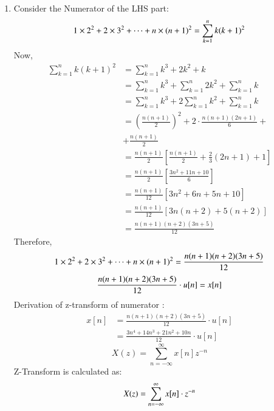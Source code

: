 \documentclass[journal,12pt,twocolumn]{IEEEtran}
\theoremstyle{remark}
\begin{document}
\begin{enumerate}[label=\alph*)]
\item Consider the Numerator of the LHS part:
\begin{equation}
    1\times2^2 + 2\times3^2 + \dots + n\times(n+1)^2 = \sum_{k=1}^n k(k+1)^2 \notag
\end{equation}
Now,
\begin{align*}
    \sum_{k=1}^n k(k+1)^2 &= \sum_{k=1}^n k^3+2k^2+k\\
                          &=  \sum_{k=1}^n k^3 + \sum_{k=1}^n 2k^2 + \sum_{k=1}^n k\\
                          &=  \sum_{k=1}^n k^3 + 2\sum_{k=1}^n k^2 + \sum_{k=1}^n k\\
                          &= \left(\frac{n(n+1)}{2}\right)^{\scriptstyle 2} + 2\cdot \frac{n(n+1)(2n+1)}{6}+\\  &+\frac{n(n+1)}{2}\\
                          &= \frac{n(n+1)}{2}\left[\frac{n(n+1)}{2} + \frac{2}{3}(2n+1) + 1\right]\\
                          &= \frac{n(n+1)}{2}\left[\frac{3n^2 + 11n +10}{6}\right]\\
                          &= \frac{n(n+1)}{12}\left[3n^2 + 6n + 5n + 10\right]\\
                          &= \frac{n(n+1)}{12}\left[3n(n+2)+5(n+2)\right]\\
                          &= \frac{n(n+1)(n+2)(3n+5)}{12}
\end{align*}
Therefore,
\begin{equation}
   1\times2^2 + 2\times3^2 + \dots + n\times(n+1)^2 = \frac{n(n+1)(n+2)(3n+5)}{12}  \notag \\
\end{equation}
\begin{align*}
    \frac{n(n+1)(n+2)(3n+5)}{12}\cdot u[n] = x[n]\notag 
\end{align*}
Derivation of z-transform of numerator :
\begin{align*}
    x[n] &= \frac{n(n+1)(n+2)(3n+5)}{12}\cdot u[n]\\
         &= \frac{3n^4 + 14n^3 + 21n^2 + 10n}{12}\cdot u[n]\
\end{align*}
\begin{equation}
    X(z) = \sum_{n=-\infty}^\infty x[n]z^{-n}
\end{equation}
Z-Transform is calculated as:
\begin{equation}
    X(z) = \sum_{n=-\infty}^\infty x[n]\cdot z^{-n}\notag

\end{equation}
\end{enumerate}
\end{document}
